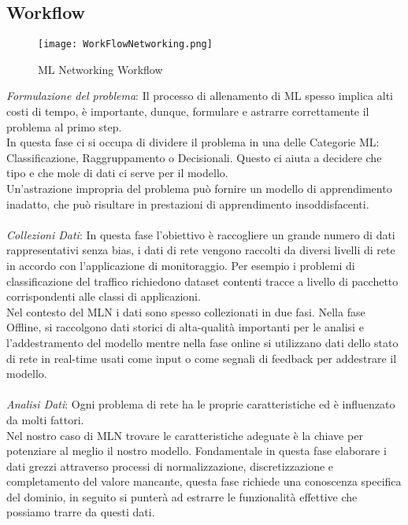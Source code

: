\documentclass[../tesi.tex]{subfiles}
\begin{document}
\subsection{Workflow}

\begin{figure}[htbp]
\texttt{[image: WorkFlowNetworking.png]}
\caption{ML Networking Workflow} 
\end{figure}


\textit{Formulazione del problema}: Il processo di allenamento di ML spesso implica alti costi di tempo, è importante, dunque, formulare e astrarre correttamente il problema al primo step.\\
In questa fase ci si occupa di dividere il problema in una delle Categorie ML: Classificazione, Raggruppamento o Decisionali.
Questo ci aiuta a decidere che tipo e che mole di dati ci serve per il modello.\\
Un'astrazione impropria del problema può fornire un modello di apprendimento inadatto, che può risultare in prestazioni di apprendimento insoddisfacenti.\\
\\
\textit{Collezioni Dati}: In questa fase l’obiettivo è raccogliere un grande numero di dati rappresentativi senza bias, i dati di rete vengono raccolti da diversi livelli di rete in  accordo con l’applicazione di monitoraggio. Per esempio i problemi di classificazione del traffico  richiedono dataset contenti tracce a livello di pacchetto corrispondenti alle classi di applicazioni.\\
Nel contesto del MLN i dati sono spesso collezionati in due fasi.
Nella fase Offline, si raccolgono dati storici di alta-qualità importanti per le analisi e l’addestramento del modello mentre nella fase online si utilizzano dati dello stato di rete in real-time usati come input o come segnali di feedback per addestrare il modello.\\
\\
\textit{Analisi Dati}: Ogni problema di rete ha le proprie caratteristiche ed è influenzato da molti fattori.\\ 
Nel nostro caso di MLN trovare le caratteristiche adeguate è la chiave per potenziare al meglio il nostro modello.
Fondamentale in questa fase elaborare i dati grezzi attraverso processi di normalizzazione, discretizzazione e completamento del valore mancante, questa fase richiede una conoscenza specifica del dominio, in seguito si punterà ad estrarre le funzionalità effettive che possiamo trarre da questi dati.\\
\end{document}
